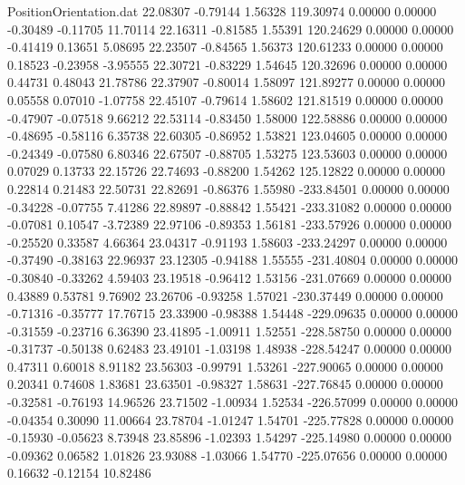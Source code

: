 \begin{filecontents}{PositionOrientation.dat}
  22.08307   -0.79144    1.56328   119.30974    0.00000    0.00000   -0.30489   -0.11705   11.70114
  22.16311   -0.81585    1.55391   120.24629    0.00000    0.00000   -0.41419    0.13651    5.08695
  22.23507   -0.84565    1.56373   120.61233    0.00000    0.00000    0.18523   -0.23958   -3.95555
  22.30721   -0.83229    1.54645   120.32696    0.00000    0.00000    0.44731    0.48043   21.78786
  22.37907   -0.80014    1.58097   121.89277    0.00000    0.00000    0.05558    0.07010   -1.07758
  22.45107   -0.79614    1.58602   121.81519    0.00000    0.00000   -0.47907   -0.07518    9.66212
  22.53114   -0.83450    1.58000   122.58886    0.00000    0.00000   -0.48695   -0.58116    6.35738
  22.60305   -0.86952    1.53821   123.04605    0.00000    0.00000   -0.24349   -0.07580    6.80346
  22.67507   -0.88705    1.53275   123.53603    0.00000    0.00000    0.07029    0.13733   22.15726
  22.74693   -0.88200    1.54262   125.12822    0.00000    0.00000    0.22814    0.21483   22.50731
  22.82691   -0.86376    1.55980  -233.84501    0.00000    0.00000   -0.34228   -0.07755    7.41286
  22.89897   -0.88842    1.55421  -233.31082    0.00000    0.00000   -0.07081    0.10547   -3.72389
  22.97106   -0.89353    1.56181  -233.57926    0.00000    0.00000   -0.25520    0.33587    4.66364
  23.04317   -0.91193    1.58603  -233.24297    0.00000    0.00000   -0.37490   -0.38163   22.96937
  23.12305   -0.94188    1.55555  -231.40804    0.00000    0.00000   -0.30840   -0.33262    4.59403
  23.19518   -0.96412    1.53156  -231.07669    0.00000    0.00000    0.43889    0.53781    9.76902
  23.26706   -0.93258    1.57021  -230.37449    0.00000    0.00000   -0.71316   -0.35777   17.76715
  23.33900   -0.98388    1.54448  -229.09635    0.00000    0.00000   -0.31559   -0.23716    6.36390
  23.41895   -1.00911    1.52551  -228.58750    0.00000    0.00000   -0.31737   -0.50138    0.62483
  23.49101   -1.03198    1.48938  -228.54247    0.00000    0.00000    0.47311    0.60018    8.91182
  23.56303   -0.99791    1.53261  -227.90065    0.00000    0.00000    0.20341    0.74608    1.83681
  23.63501   -0.98327    1.58631  -227.76845    0.00000    0.00000   -0.32581   -0.76193   14.96526
  23.71502   -1.00934    1.52534  -226.57099    0.00000    0.00000   -0.04354    0.30090   11.00664
  23.78704   -1.01247    1.54701  -225.77828    0.00000    0.00000   -0.15930   -0.05623    8.73948
  23.85896   -1.02393    1.54297  -225.14980    0.00000    0.00000   -0.09362    0.06582    1.01826
  23.93088   -1.03066    1.54770  -225.07656    0.00000    0.00000    0.16632   -0.12154   10.82486

\end{filecontents}
